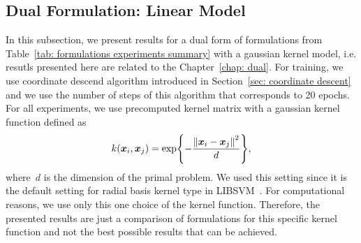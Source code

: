 \subsection{Dual Formulation: Linear Model}\label{sec: results dual}

In this subsection, we present results for a dual form of formulations from Table~\ref{tab: formulations experiments summary} with a gaussian kernel model, i.e. resutls presented here are related to the Chapter~\ref{chap: dual}. For training, we use coordinate descend algorithm introduced in Section~\ref{sec: coordinate descent} and we use the number of steps of this algorithm that corresponds to 20 epochs. For all experiments, we use precomputed kernel matrix with a gaussian kernel function defined as 
\begin{equation*}
  k(\bm{x}_i, \bm{x}_j) = \exp\Brac[c]{- \frac{\norm{\bm{x}_i - \bm{x}_j}^2}{d}},
\end{equation*}
where~$d$ is the dimension of the primal problem. We used this setting since it is the default setting for radial basis kernel type in LIBSVM~\cite{chang2011libsvm}. For computational reasons, we use only this one choice of the kernel function. Therefore, the presented results are just a comparison of formulations for this specific kernel function and not the best possible results that can be achieved.

